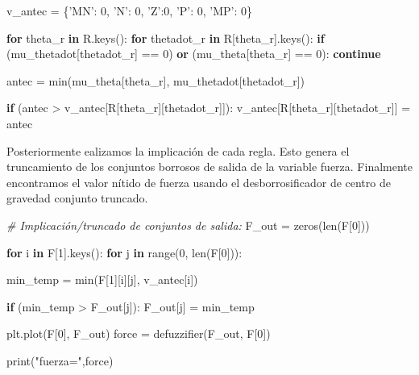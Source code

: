 \documentclass[onecolumn]{article}
\newenvironment{Shaded}{}{}
\newcommand{\BuiltInTok}[1]{#1}
\newcommand{\CommentTok}[1]{\textcolor[rgb]{0.38,0.63,0.69}{\textit{#1}}}
\newcommand{\ControlFlowTok}[1]{\textcolor[rgb]{0.00,0.44,0.13}{\textbf{#1}}}
\newcommand{\DecValTok}[1]{\textcolor[rgb]{0.25,0.63,0.44}{#1}}
\newcommand{\KeywordTok}[1]{\textcolor[rgb]{0.00,0.44,0.13}{\textbf{#1}}}
\newcommand{\NormalTok}[1]{#1}
\newcommand{\OperatorTok}[1]{\textcolor[rgb]{0.40,0.40,0.40}{#1}}
\newcommand{\StringTok}[1]{\textcolor[rgb]{0.25,0.44,0.63}{#1}}
\begin{document}
\begin{Shaded}
\begin{Highlighting}[]
\NormalTok{v_antec }\OperatorTok{=}\NormalTok{ \{}\StringTok{'MN'}\NormalTok{: }\DecValTok{0}\NormalTok{, }\StringTok{'N'}\NormalTok{: }\DecValTok{0}\NormalTok{, }\StringTok{'Z'}\NormalTok{:}\DecValTok{0}\NormalTok{, }\StringTok{'P'}\NormalTok{: }\DecValTok{0}\NormalTok{, }\StringTok{'MP'}\NormalTok{: }\DecValTok{0}\NormalTok{\}}

\ControlFlowTok{for}\NormalTok{ theta_r }\KeywordTok{in}\NormalTok{ R.keys():}
    \ControlFlowTok{for}\NormalTok{ thetadot_r }\KeywordTok{in}\NormalTok{ R[theta_r].keys():}
        \ControlFlowTok{if}\NormalTok{ (mu_thetadot[thetadot_r] }\OperatorTok{==} \DecValTok{0}\NormalTok{) }\KeywordTok{or}\NormalTok{ (mu_theta[theta_r] }\OperatorTok{==} \DecValTok{0}\NormalTok{): }
            \ControlFlowTok{continue}

\NormalTok{        antec }\OperatorTok{=} \BuiltInTok{min}\NormalTok{(mu_theta[theta_r], mu_thetadot[thetadot_r])}

        \ControlFlowTok{if}\NormalTok{ (antec }\OperatorTok{>}\NormalTok{ v_antec[R[theta_r][thetadot_r]]):}
\NormalTok{            v_antec[R[theta_r][thetadot_r]] }\OperatorTok{=}\NormalTok{ antec}
\end{Highlighting}
\end{Shaded}

Posteriormente ealizamos la implicación de cada regla. Esto genera el
truncamiento de los conjuntos borrosos de salida de la variable fuerza.
Finalmente encontramos el valor nítido de fuerza usando el
desborrosificador de centro de gravedad conjunto truncado.

\begin{Shaded}
\begin{Highlighting}[]
\CommentTok{# Implicación/truncado de conjuntos de salida:    }
\NormalTok{F_out }\OperatorTok{=}\NormalTok{ zeros(}\BuiltInTok{len}\NormalTok{(F[}\DecValTok{0}\NormalTok{]))}

\ControlFlowTok{for}\NormalTok{ i }\KeywordTok{in}\NormalTok{ F[}\DecValTok{1}\NormalTok{].keys():}
    \ControlFlowTok{for}\NormalTok{ j }\KeywordTok{in} \BuiltInTok{range}\NormalTok{(}\DecValTok{0}\NormalTok{, }\BuiltInTok{len}\NormalTok{(F[}\DecValTok{0}\NormalTok{])):}

\NormalTok{        min_temp }\OperatorTok{=} \BuiltInTok{min}\NormalTok{(F[}\DecValTok{1}\NormalTok{][i][j], v_antec[i])}

        \ControlFlowTok{if}\NormalTok{ (min_temp }\OperatorTok{>}\NormalTok{ F_out[j]):}
\NormalTok{            F_out[j] }\OperatorTok{=}\NormalTok{ min_temp            }

\NormalTok{plt.plot(F[}\DecValTok{0}\NormalTok{], F_out)}
\NormalTok{force }\OperatorTok{=}\NormalTok{ defuzzifier(F_out, F[}\DecValTok{0}\NormalTok{])}

\BuiltInTok{print}\NormalTok{(}\StringTok{"fuerza="}\NormalTok{,force)}
\end{Highlighting}
\end{Shaded}
\end{document}
